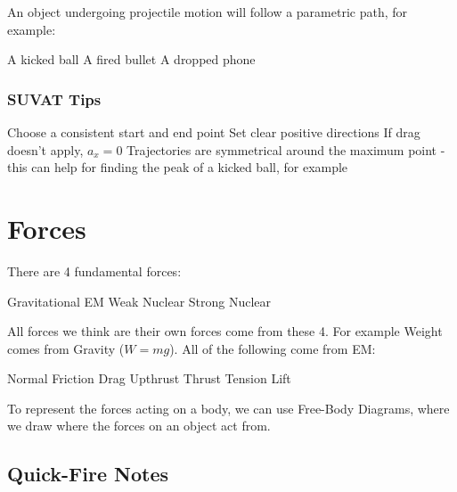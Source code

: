 An object undergoing projectile motion will follow a parametric path, for example:
\begin{itemize}
	\ii A kicked ball
	\ii A fired bullet
	\ii A dropped phone
\end{itemize}

\subsection{SUVAT Tips}
\begin{itemize}
	\ii Choose a consistent start and end point
	\ii Set clear positive directions
	\ii If drag doesn't apply, \(a_x = 0\)
	\ii Trajectories are symmetrical around the maximum point - this can help for finding the peak of a kicked ball, for example
\end{itemize}




\chapter{Forces}
There are 4 fundamental forces:
\begin{enumerate}
	\ii Gravitational
	\ii EM
	\ii Weak Nuclear
	\ii Strong Nuclear
\end{enumerate}

All forces we think are their own forces come from these 4. For example Weight comes from Gravity (\(W = mg\)). All of the following come from EM:
\begin{itemize}
	\ii Normal
	\ii Friction
	\ii Drag
	\ii Upthrust
	\ii Thrust
	\ii Tension
	\ii Lift
\end{itemize}

To represent the forces acting on a body, we can use Free-Body Diagrams, where we draw where the forces on an object act from.


\section{Quick-Fire Notes}
